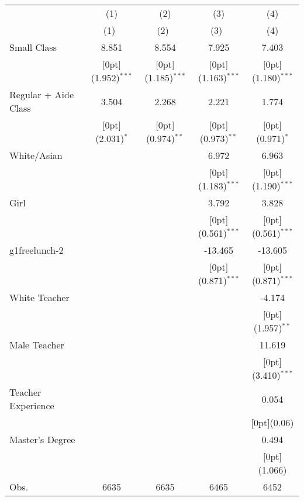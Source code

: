 \begin{tabular*}{\textwidth}{@{\extracolsep{\fill}}lcccc}				
	& \multicolumn{1}{c}{(1)} &	\multicolumn{1}{c}{(2)} &	\multicolumn{1}{c}{(3)} &	\multicolumn{1}{c}{(4)} \\
\cline{2-5}				
	& \multicolumn{1}{c}{(1)\mbox{\ }} &	\multicolumn{1}{c}{(2)\mbox{\ }} &	\multicolumn{1}{c}{(3)\mbox{\ }} &	\multicolumn{1}{c}{(4)} \\
\hline				
Small Class &	8.851 &	8.554 &	7.925 &	7.403 \\
&	\raisebox{.7ex}[0pt]{\scriptsize (1.952)$^{***}$} &	\raisebox{.7ex}[0pt]{\scriptsize (1.185)$^{***}$} &	\raisebox{.7ex}[0pt]{\scriptsize (1.163)$^{***}$} &	\raisebox{.7ex}[0pt]{\scriptsize (1.180)$^{***}$} \\
Regular + Aide Class &	3.504 &	2.268 &	2.221 &	1.774 \\
&	\raisebox{.7ex}[0pt]{\scriptsize (2.031)$^{*}$} &	\raisebox{.7ex}[0pt]{\scriptsize (0.974)$^{**}$} &	\raisebox{.7ex}[0pt]{\scriptsize (0.973)$^{**}$} &	\raisebox{.7ex}[0pt]{\scriptsize (0.971)$^{*}$} \\
White/Asian &	&	&	6.972 &	6.963 \\
&	&	&	\raisebox{.7ex}[0pt]{\scriptsize (1.183)$^{***}$} &	\raisebox{.7ex}[0pt]{\scriptsize (1.190)$^{***}$} \\
Girl &	&	&	3.792 &	3.828 \\
&	&	&	\raisebox{.7ex}[0pt]{\scriptsize (0.561)$^{***}$} &	\raisebox{.7ex}[0pt]{\scriptsize (0.561)$^{***}$} \\
g1freelunch-2 &	&	&	-13.465 &	-13.605 \\
&	&	&	\raisebox{.7ex}[0pt]{\scriptsize (0.871)$^{***}$} &	\raisebox{.7ex}[0pt]{\scriptsize (0.871)$^{***}$} \\
White Teacher &	&	&	&	-4.174 \\
&	&	&	&	\raisebox{.7ex}[0pt]{\scriptsize (1.957)$^{**}$} \\
Male Teacher &	&	&	&	11.619 \\
&	&	&	&	\raisebox{.7ex}[0pt]{\scriptsize (3.410)$^{***}$} \\
Teacher Experience &	&	&	&	0.054 \\
&	&	&	&	\raisebox{.7ex}[0pt]{\scriptsize (0.06)} \\
Master's Degree &	&	&	&	0.494 \\
&	&	&	&	\raisebox{.7ex}[0pt]{\scriptsize (1.066)} \\
Obs. &	6635 &	6635 &	6465 &	6452 \\
\hline\hline				
\end{tabular*}%

